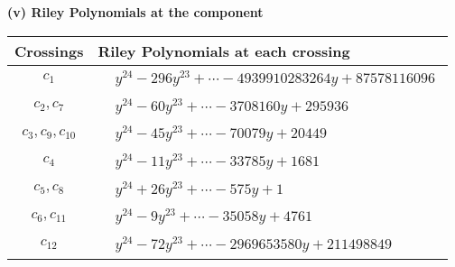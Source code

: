 \documentclass[1p]{elsarticle_modified}
\theoremstyle{definition}
\begin{document}
\flushleft \textbf{(v) Riley Polynomials at the component}\newline \\
\begin{tabular}{m{50pt}|m{274pt}}
Crossings & \hspace{64pt}Riley Polynomials at each crossing \\
\hline $$\begin{aligned}c_{1}\end{aligned}$$&$\begin{aligned}
&y^{24}-296 y^{23}+\cdots-4939910283264 y+87578116096
\end{aligned}$\\
\hline $$\begin{aligned}c_{2},c_{7}\end{aligned}$$&$\begin{aligned}
&y^{24}-60 y^{23}+\cdots-3708160 y+295936
\end{aligned}$\\
\hline $$\begin{aligned}c_{3},c_{9},c_{10}\end{aligned}$$&$\begin{aligned}
&y^{24}-45 y^{23}+\cdots-70079 y+20449
\end{aligned}$\\
\hline $$\begin{aligned}c_{4}\end{aligned}$$&$\begin{aligned}
&y^{24}-11 y^{23}+\cdots-33785 y+1681
\end{aligned}$\\
\hline $$\begin{aligned}c_{5},c_{8}\end{aligned}$$&$\begin{aligned}
&y^{24}+26 y^{23}+\cdots-575 y+1
\end{aligned}$\\
\hline $$\begin{aligned}c_{6},c_{11}\end{aligned}$$&$\begin{aligned}
&y^{24}-9 y^{23}+\cdots-35058 y+4761
\end{aligned}$\\
\hline $$\begin{aligned}c_{12}\end{aligned}$$&$\begin{aligned}
&y^{24}-72 y^{23}+\cdots-2969653580 y+211498849
\end{aligned}$\\
\hline
\end{tabular}\\~\\
\end{document}
